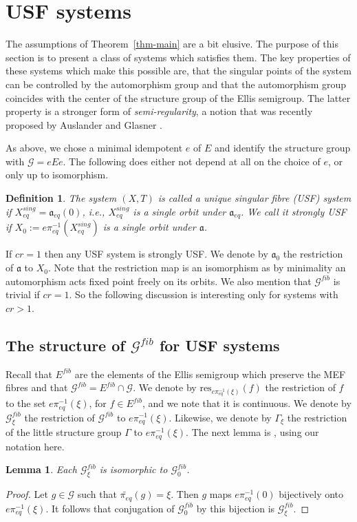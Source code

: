 \documentclass[10pt,a4paper]{amsart}
\newtheorem{lemma}[theorem]{Lemma}
\newtheorem{definition}[theorem]{Definition}
\numberwithin{equation}{section}
\newcommand{\Gg}{{\mathcal G}}
\newcommand{\Xe}{X_{eq}}
\newcommand{\aut}{{\mathfrak a}}
\newcommand{\aute}{\aut_{eq}}
\newcommand{\pe}{\pi_{eq}}
\newcommand{\tpe}{\widetilde{\pe}}
\newcommand{\Ef}{E^{fib}}
\newcommand{\res}{\mathrm{res}}
\newcommand{\Gf}{\Gg^{fib}}
\begin{document}


\section{USF systems}\label{sec:USF-systems} 
The assumptions of Theorem~\ref{thm-main} are a bit elusive.    
The purpose of this section is to present a class of systems which satisfies them. The key properties of these systems which make this possible are, that the singular points of the system can be controlled by the automorphism group and that the automorphism group coincides with the center of the structure group of the Ellis semigroup. The latter property is a stronger form of {\em semi-regularity}, a notion that was recently proposed by Auslander and Glasner \cite{AG}.

As above, we chose a minimal idempotent $e$ of $E$ and identify the structure group with $\Gg=eEe$.
 The following does either not depend at all on the choice of $e$, or only up to isomorphism. 
\begin{definition} The system
 $(X,T)$ is called a \emph{unique singular fibre} (USF) system if  $\Xe^{sing}=\aute(0)$, i.e., $\Xe^{sing}$ is a single orbit under $\aute$. We call it \emph{strongly} USF if 
$X_0:=e\pe^{-1}(\Xe^{sing})$ is a single orbit under $\aut$. 
\end{definition}
If $cr=1$ then any USF system is strongly USF. 
We denote by $\aut_0$ the restriction of $\aut$ to $X_0$. Note that the restriction map is an isomorphism as by minimality an automorphism acts fixed point freely on its orbits. We also mention that $\Gg^{fib}$ is trivial if $cr=1$. So the following discussion is interesting only for systems with $cr>1$.

\subsection{The structure of $\Gg^{fib}$ for USF systems}
Recall that $\Ef$ are the elements of the Ellis semigroup which preserve the MEF fibres and that $\Gf = \Ef\cap \Gg $. We denote by 
 $\res_{e\pe^{-1}(\xi) }(f)$ the restriction of $f$ to the set $e\pe^{-1}(\xi)$,  for $f\in \Ef$, and we note that it is continuous.
We denote by  $\Gf_\xi$ the restriction of $\Gf$ to $e\pe^{-1}(\xi)$.
Likewise, we denote by $\Gamma_\xi$ the restriction of the little structure group $\Gamma$ to $e\pe^{-1}(\xi)$. The next lemma is \cite[Lemma 3.3]{ESBS}, using our notation here.
 \begin{lemma}
Each $\Gg^{fib}_\xi$ is isomorphic to $\Gf_0$.
\end{lemma}
\begin{proof}
Let $g\in \Gg$ such that $ \tpe(g) =\xi$. Then $g$ maps $e\pe^{-1}(0)$ bijectively onto $e\pe^{-1}(\xi)$. It follows that conjugation of $\Gg^{fib}_0$ by this bijection is $\Gg^{fib}_\xi$.
\end{proof}
\end{document}
